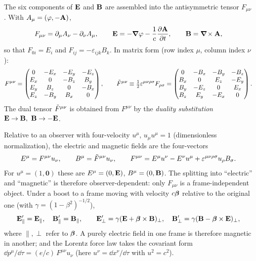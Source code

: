 The six components of $\mathbf{E}$ and $\mathbf{B}$ are assembled into the
antisymmetric tensor $F_{\mu\nu}$.  With $A_\mu=(\varphi,-\mathbf{A})$,
\begin{equation}\label{eq:potentials}
F_{\mu\nu}=\partial_\mu A_\nu-\partial_\nu A_\mu ,\qquad
\mathbf{E}=-\boldsymbol{\nabla}\varphi-\frac1c\frac{\partial\mathbf{A}}{\partial t},\qquad
\mathbf{B}=\boldsymbol{\nabla}\!\times\mathbf{A} ,
\end{equation}
so that $F_{0i}=E_i$ and $F_{ij}=-\varepsilon_{ijk}B_k$.  In matrix form
(row index $\mu$, column index $\nu$):
\begin{equation}\label{eq:Fmatrix}
F^{\mu\nu}=\begin{pmatrix}
0&-E_x&-E_y&-E_z\\
E_x&0&-B_z&B_y\\
E_y&B_z&0&-B_x\\
E_z&-B_y&B_x&0
\end{pmatrix},\qquad
\tilde F^{\mu\nu}\equiv\tfrac12\varepsilon^{\mu\nu\rho\sigma}F_{\rho\sigma}=\begin{pmatrix}
0&-B_x&-B_y&-B_z\\
B_x&0&E_z&-E_y\\
B_y&-E_z&0&E_x\\
B_z&E_y&-E_x&0
\end{pmatrix}.
\end{equation}
The dual tensor $\tilde F^{\mu\nu}$ is obtained from $F^{\mu\nu}$ by the
\emph{duality substitution} $\mathbf{E}\to\mathbf{B},\ \mathbf{B}\to-\mathbf{E}$.

Relative to an observer with four-velocity $u^\mu$, $u_\mu u^\mu=1$
(dimensionless normalization), the electric and magnetic fields are the
four-vectors
\begin{equation}\label{eq:EB-observer}
E^\mu=F^{\mu\nu}u_\nu,\qquad B^\mu=\tilde F^{\mu\nu}u_\nu,\qquad
F^{\mu\nu}=E^\mu u^\nu-E^\nu u^\mu+\varepsilon^{\mu\nu\rho\sigma}u_\rho B_\sigma .
\end{equation}
For $u^\mu=(1,\mathbf 0)$ these are $E^\mu=(0,\mathbf{E})$, $B^\mu=(0,\mathbf{B})$.  The
splitting into ``electric'' and ``magnetic'' is therefore
observer-dependent: only $F_{\mu\nu}$ is a frame-independent object.
Under a boost to a frame moving with velocity $c\boldsymbol{\beta}$ relative to the
original one (with $\gamma=(1-\beta^2)^{-1/2}$),
\begin{equation}\label{eq:boost}
\mathbf{E}'_\parallel=\mathbf{E}_\parallel,\quad \mathbf{B}'_\parallel=\mathbf{B}_\parallel,\qquad
\mathbf{E}'_\perp=\gamma(\mathbf{E}+\boldsymbol{\beta}\times\mathbf{B})_\perp,\quad
\mathbf{B}'_\perp=\gamma(\mathbf{B}-\boldsymbol{\beta}\times\mathbf{E})_\perp ,
\end{equation}
where $\parallel,\perp$ refer to $\boldsymbol{\beta}$.  A purely electric field in
one frame is therefore magnetic in another; and the Lorentz force law
takes the covariant form $\dd p^\mu/\dd\tau=(e/c)\,F^{\mu\nu}u_\nu$ (here
$u^\nu=\dd x^\nu/\dd\tau$ with $u^2=c^2$).


